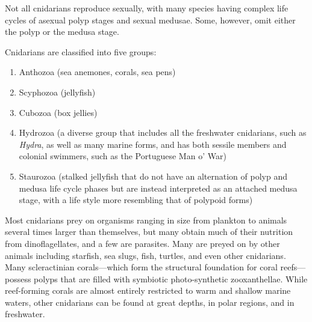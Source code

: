 \documentclass[]{book}
\providecommand{\tightlist}{%
  \setlength{\itemsep}{0pt}\setlength{\parskip}{0pt}}
\begin{document}
Not all cnidarians reproduce sexually, with many species having complex life cycles of asexual polyp stages and sexual medusae. Some, however, omit either the polyp or the medusa stage.

Cnidarians are classified into five groups:

\begin{enumerate}
\def\labelenumi{\arabic{enumi}.}
\tightlist
\item
  Anthozoa (sea anemones, corals, sea pens)
\item
  Scyphozoa (jellyfish)
\item
  Cubozoa (box jellies)
\item
  Hydrozoa (a diverse group that includes all the freshwater cnidarians, such as \emph{Hydra}, as well as many marine forms, and has both sessile members and colonial swimmers, such as the Portuguese Man o' War)
\item
  Staurozoa (stalked jellyfish that do not have an alternation of polyp and medusa life cycle phases but are instead interpreted as an attached medusa stage, with a life style more resembling that of polypoid forms)
\end{enumerate}

Most cnidarians prey on organisms ranging in size from plankton to animals several times larger than themselves, but many obtain much of their nutrition from dinoflagellates, and a few are parasites. Many are preyed on by other animals including starfish, sea slugs, fish, turtles, and even other cnidarians. Many scleractinian corals---which form the structural foundation for coral reefs---possess polyps that are filled with symbiotic photo-synthetic zooxanthellae. While reef-forming corals are almost entirely restricted to warm and shallow marine waters, other cnidarians can be found at great depths, in polar regions, and in freshwater.
\end{document}
